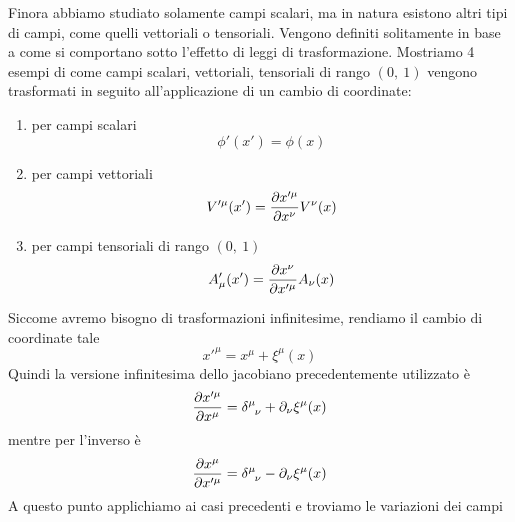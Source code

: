 Finora abbiamo studiato solamente campi scalari, ma in natura esistono altri tipi di campi, come quelli vettoriali o tensoriali. Vengono definiti solitamente in base a come si comportano sotto l'effetto di leggi di trasformazione. Mostriamo 4 esempi di come campi scalari, vettoriali, tensoriali di rango $(0,~1)$ vengono trasformati in seguito all'applicazione di un cambio di coordinate:
\begin{enumerate}
    \item per campi scalari
\begin{equation}
    \phi'(x') = \phi(x)
\end{equation}
    \item per campi vettoriali
\begin{equation}
    V'^\mu(x') = \frac{\partial x'^\mu}{\partial x^\nu} V^\nu(x)
\end{equation}
    \item per campi tensoriali di rango $(0,~1)$
\begin{equation}
    A'_\mu(x') = \frac{\partial x^\nu}{\partial x'^\mu} A_\nu(x)
\end{equation}
\end{enumerate} 
    Siccome avremo bisogno di trasformazioni infinitesime, rendiamo il cambio di coordinate tale 
\begin{equation}
    x'^\mu = x^\mu + \xi^\mu(x)
\end{equation}
    Quindi la versione infinitesima dello jacobiano precedentemente utilizzato è 
\begin{equation}
    \pdv{x'^\mu}{x^\mu} = \delta^{\mu}_{\phantom \mu \nu} + \partial_\nu \xi^\mu(x)
\end{equation}
    mentre per l'inverso è 
\begin{equation}
    \pdv{x^\mu}{x'^\mu} = \delta^{\mu}_{\phantom \mu \nu} - \partial_\nu \xi^\mu(x)
\end{equation}
    A questo punto applichiamo ai casi precedenti e troviamo le variazioni dei campi
